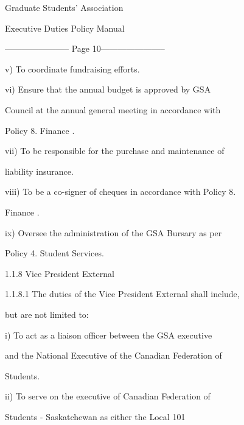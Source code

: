                                     Graduate Students’ Association  

                                   Executive Duties Policy Manual  

  


----------------------- Page 10-----------------------

         v)       To coordinate fundraising efforts.   

  

         vi)      Ensure  that  the  annual  budget  is  approved  by  GSA  

                  Council at the annual general meeting in accordance with  

                  Policy 8. Finance .   

  

         vii)     To  be  responsible  for  the  purchase  and  maintenance  of  

                  liability insurance.   

  

         viii)    To be a co-signer of cheques in accordance with Policy 8.  

                  Finance .   

           



         ix)      Oversee  the  administration  of  the  GSA  Bursary  as  per  

                  Policy 4. Student Services.   

  

1.1.8  Vice President External  

  

1.1.8.1           The  duties of the  Vice  President  External  shall  include,  

         but are not limited to:   

  

         i)       To  act  as  a  liaison  officer  between  the  GSA  executive  

                  and the National Executive of the Canadian Federation of  

                  Students.   

  

         ii)      To  serve  on  the  executive  of  Canadian  Federation  of  

                  Students        -   Saskatchewan           as    either     the    Local      101  

